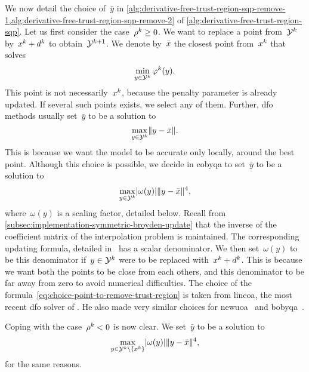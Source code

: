 We now detail the choice of~$\bar{y}$ in \cref{alg:derivative-free-trust-region-sqp-remove-1,alg:derivative-free-trust-region-sqp-remove-2} of \cref{alg:derivative-free-trust-region-sqp}.
Let us first consider the case~$\ratio[k] \ge 0$.
We want to replace a point from~$\xpt[k]$ by~$\iter[k] + \step[k]$ to obtain~$\xpt[k + 1]$.
We denote by~$\bar{\iter}$ the closest point from~$\iter[k]$ that solves
\begin{equation*}
    \min_{y \in \xpt[k]} \merit[k](y).
\end{equation*}
This point is not necessarily~$\iter[k]$, because the penalty parameter is already updated.
If several such points exists, we select any of them.
Further, \gls{dfo} methods usually set~$\bar{y}$ to be a solution to
\begin{equation*}
    \max_{y \in \xpt[k]} \norm{y - \bar{\iter}}.
\end{equation*}
This is because we want the model to be accurate only locally, around the best point.
Although this choice is possible, we decide in \gls{cobyqa} to set~$\bar{y}$ to be a solution to
\begin{equation}
    \label{eq:choice-point-to-remove-trust-region}
    \max_{y \in \xpt[k]} \abs{\omega(y)} \norm{y - \bar{\iter}}^4,
\end{equation}
where~$\omega(y)$ is a scaling factor, detailed below.
Recall from \cref{subsec:implementation-symmetric-broyden-update} that the inverse of the coefficient matrix of the interpolation problem is maintained.
The corresponding updating formula, detailed in~\cite[Eq.~(2.12)]{Powell_2004c} has a scalar denominator.
We then set~$\omega(y)$ to be this denominator if~$y \in \xpt[k]$ were to be replaced with~$\iter[k] + \step[k]$.
This is because we want both the points to be close from each others, and this denominator to be far away from zero to avoid numerical difficulties.
The choice of the formula~\cref{eq:choice-point-to-remove-trust-region} is taken from \gls{lincoa}, the most recent \gls{dfo} solver of \citeauthor{Powell_2015}.
He also made very similar choices for \gls{newuoa}~\cite[Eq.~(7.4)]{Powell_2006} and \gls{bobyqa}~\cite[Eq.~(6.1)]{Powell_2009}.

Coping with the case~$\ratio[k] < 0$ is now clear.
We set~$\bar{y}$ to be a solution to
\begin{equation*}
    \max_{y \in \xpt[k] \setminus \set{\iter[k]}} \abs{\omega(y)} \norm{y - \bar{\iter}}^4,
\end{equation*}
for the same reasons.

